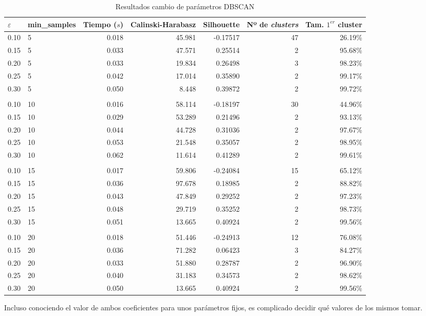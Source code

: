 \documentclass[a4paper, 20pt]{article}
\begin{document}
\begin{table}[H]
\centering
\caption{Resultados cambio de parámetros DBSCAN}
\label{tab:param_dbscan2}
\begin{tabular}{llrrrrr}
\toprule
$\varepsilon$ & min\_samples & Tiempo ($s$) & Calinski-Harabasz & Silhouette & Nº de \textit{clusters} & Tam. $1^{er}$ cluster\\
\midrule
0.10 & 5 & 0.018 & 45.981 & -0.17517 & 47 & 26.19\% \\
0.15 & 5 & 0.033 & 47.571 & 0.25514 & 2 & 95.68\% \\
0.20 & 5 & 0.033 & 19.834 & 0.26498 & 3 & 98.23\% \\
0.25 & 5 & 0.042 & 17.014 & 0.35890 & 2 & 99.17\% \\
0.30 & 5 & 0.050 & 8.448 & 0.39872 & 2 & 99.72\% \\
\\
0.10 & 10 & 0.016 & 58.114 & -0.18197 & 30 & 44.96\% \\
0.15 & 10 & 0.029 & 53.289 & 0.21496 & 2 & 93.13\% \\
0.20 & 10 & 0.044 & 44.728 & 0.31036 & 2 & 97.67\% \\
0.25 & 10 & 0.053 & 21.548 & 0.35057 & 2 & 98.95\% \\
0.30 & 10 & 0.062 & 11.614 & 0.41289 & 2 & 99.61\% \\
\\
0.10 & 15 & 0.017 & 59.806 & -0.24084 & 15 & 65.12\% \\
0.15 & 15 & 0.036 & 97.678 & 0.18985 & 2 & 88.82\% \\
0.20 & 15 & 0.043 & 47.849 & 0.29252 & 2 & 97.23\% \\
0.25 & 15 & 0.048 & 29.719 & 0.35252 & 2 & 98.73\% \\
0.30 & 15 & 0.051 & 13.665 & 0.40924 & 2 & 99.56\% \\
\\
0.10 & 20 & 0.018 & 51.446 & -0.24913 & 12 & 76.08\% \\
0.15 & 20 & 0.036 & 71.282 & 0.06423 & 3 & 84.27\% \\
0.20 & 20 & 0.033 & 51.880 & 0.28787 & 2 & 96.90\% \\
0.25 & 20 & 0.040 & 31.183 & 0.34573 & 2 & 98.62\% \\
0.30 & 20 & 0.050 & 13.665 & 0.40924 & 2 & 99.56\% \\
\bottomrule
\end{tabular}
\end{table}


Incluso conociendo el valor de ambos coeficientes para unos parámetros fijos, es complicado decidir qué valores de los mismos tomar.
\end{document}
